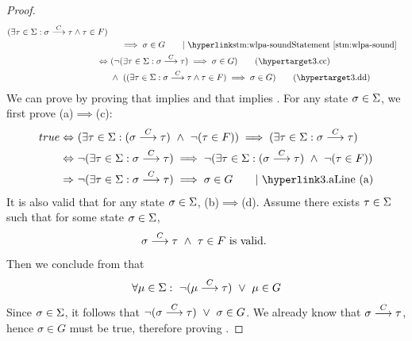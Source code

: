 \begin{proof}
\begin{align*}
	(\exists \tau\in\S: \sigma\goto{C}\tau\wedge  \tau\in F)\\
	&\ \ \ \ \implies \sigma\in G \tag*{$\mid$ \stm{wlpa-sound}}\\
	\Leftrightarrow&\  (\neg(\exists \tau\in\S: \sigma\goto{C}\tau)\implies \sigma\in G ) \tag{\lblth{c}}\\
	&\ \wedge\ ((\exists \tau\in\S: \sigma\goto{C}\tau\wedge  \tau\in F)\implies\sigma\in G) \tag{\lblth{d}}\\
\end{align*}
We can prove  by proving that  implies  and that  implies .
For any state $\sigma\in\S$, we first prove (a)$\implies$(c):
\begin{align*}
	true 
	\Leftrightarrow&\ (\exists\tau\in\S:(\sigma\goto{C}\tau)\ \wedge\ \neg(\tau\in F)) \implies (\exists\tau\in\S:\sigma\goto{C}\tau)\\ 
	\Leftrightarrow&\ \neg(\exists\tau\in\S:\sigma\goto{C}\tau) \implies \neg(\exists\tau\in\S:(\sigma\goto{C}\tau)\ \wedge\ \neg(\tau\in F))  \\ 
	\Rightarrow&\ \neg(\exists\tau\in\S:\sigma\goto{C}\tau) \implies \sigma\in G \tag*{$\mid$ \refth{a}}\\
\end{align*}
It is also valid that for any state $\sigma\in\S$, (b)$\implies$(d). 
Assume there exists $\tau\in\S$ such that for some state $\sigma\in\S$, 
$$\sigma\goto{C}\tau\ \wedge\  \tau\in F \text{ is valid. }$$
Then we conclude from  that 
$$\forall \mu\in\S:\ \neg (\mu\goto{C}\tau)\ \vee\ \mu\in G$$
Since $\sigma\in\S$, it follows that $\neg(\sigma\goto{C}\tau)\ \vee\ \sigma\in G$. 
We already know that $\sigma\goto{C}\tau$, hence $\sigma\in G$ must be true, therefore proving . 
\end{proof}

